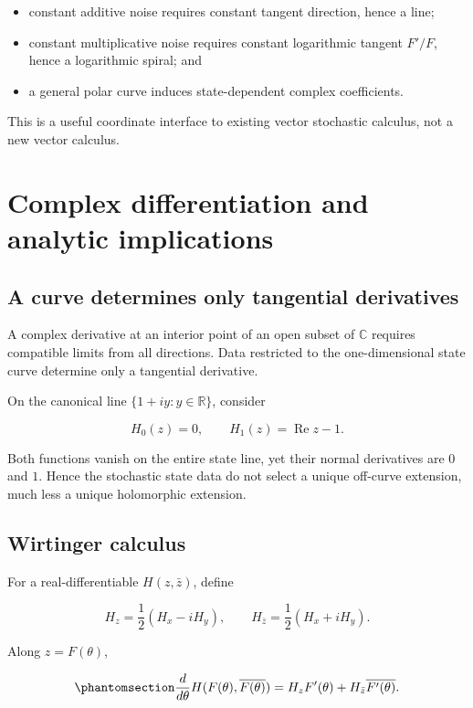 \documentclass[
  english,
  10pt,
  letterpaper,
  DIV=11,
  numbers=noendperiod]{scrartcl}
\providecommand{\tightlist}{%
  \setlength{\itemsep}{0pt}\setlength{\parskip}{0pt}}
\theoremstyle{definition}
\theoremstyle{plain}
\theoremstyle{plain}
\theoremstyle{remark}
\begin{document}
\begin{itemize}
\tightlist
\item
  constant additive noise requires constant tangent direction, hence a
  line;
\item
  constant multiplicative noise requires constant logarithmic tangent
  \(F'/F\), hence a logarithmic spiral; and
\item
  a general polar curve induces state-dependent complex coefficients.
\end{itemize}

This is a useful coordinate interface to existing vector stochastic
calculus, not a new vector calculus.

\section{Complex differentiation and analytic
implications}\label{sec-complex-analysis}

\subsection{A curve determines only tangential
derivatives}\label{a-curve-determines-only-tangential-derivatives}

A complex derivative at an interior point of an open subset of
\(\mathbb C\) requires compatible limits from all directions. Data
restricted to the one-dimensional state curve determine only a
tangential derivative.

On the canonical line \(\{1+iy:y\in\mathbb R\}\), consider

\[
H_0(z)=0,\qquad
H_1(z)=\operatorname{Re}z-1.
\]

Both functions vanish on the entire state line, yet their normal
derivatives are \(0\) and \(1\). Hence the stochastic state data do not
select a unique off-curve extension, much less a unique holomorphic
extension.

\subsection{Wirtinger calculus}\label{wirtinger-calculus}

For a real-differentiable \(H(z,\bar z)\), define

\[
H_z=\frac12(H_x-iH_y),
\qquad
H_{\bar z}=\frac12(H_x+iH_y).
\]

Along \(z=F(\theta)\),

\begin{equation}\protect\phantomsection\label{eq-wirtinger-pullback}{
\frac{d}{d\theta}
H(F(\theta),\overline{F(\theta)})
=
H_zF'(\theta)+H_{\bar z}\overline{F'(\theta)}.
}\end{equation}
\end{document}
